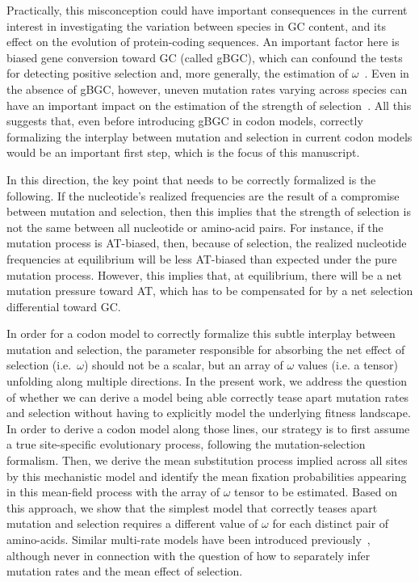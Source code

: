 \documentclass{article}
\begin{document}
Practically, this misconception could have important consequences in the current interest in investigating the variation between species in GC content, and its effect on the evolution of protein-coding sequences.
An important factor here is biased gene conversion toward GC (called {gBGC}), which can confound the tests for detecting positive selection and, more generally, the estimation of $\omega$~\citep{Galtier2009,Ratnakumar2010, Lartillot2013, Figuet2014, Bolivar2019}.
Even in the absence of {gBGC}, however, uneven mutation rates varying across species can have an important impact on the estimation of the strength of selection~\citep{Gueguen2018}.
All this suggests that, even before introducing {gBGC} in codon models, correctly formalizing the interplay between mutation and selection in current codon models would be an important first step, which is the focus of this manuscript.

In this direction, the key point that needs to be correctly formalized is the following.
If the nucleotide's realized frequencies are the result of a compromise between mutation and selection, then this implies that the strength of selection is not the same between all nucleotide or amino-acid pairs.
For instance, if the mutation process is AT-biased, then, because of selection, the realized nucleotide frequencies at equilibrium will be less AT-biased than expected under the pure mutation process.
However, this implies that, at equilibrium, there will be a net mutation pressure toward AT, which has to be compensated for by a net selection differential toward GC.

In order for a codon model to correctly formalize this subtle interplay between mutation and selection, the parameter responsible for absorbing the net effect of selection (i.e.~$\omega$) should not be a scalar, but an array of $\omega$ values (i.e. a tensor) unfolding along multiple directions.
In the present work, we address the question of whether we can derive a model being able correctly tease apart mutation rates and selection without having to explicitly model the underlying fitness landscape.
In order to derive a codon model along those lines, our strategy is to first assume a true site-specific evolutionary process, following the mutation-selection formalism.
Then, we derive the mean {substitution} process implied across all sites by this mechanistic model and identify the mean fixation probabilities appearing in this mean-field process with the array of $\omega$ tensor to be estimated.
Based on this approach, we show that the simplest model that correctly teases apart mutation and selection requires a different value of $\omega$ for each distinct pair of amino-acids.
Similar multi-rate models have been introduced previously~\citep{Delport2010}, although never in connection with the question of how to separately infer mutation rates and the mean effect of selection.
\end{document}
